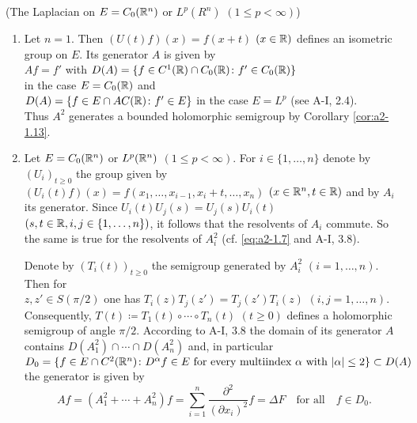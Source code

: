 \begin{example*}\label{ex:a2-1.13-kgk}(The Laplacian on $E = C_{0}(\mathbb{R}^{n})$ or $L^{p}(R^{n})$ $(1 \leq p < \infty)$)
\begin{enumerate}[\upshape (i), wide, labelsep=1em, itemsep=1ex]
\item \label{ex:a2-1.13-kgk-1}
Let $n = 1$.
Then $(U(t)f)(x) = f(x+t)$ $(x \in \mathbb{R})$ defines an isometric group on $E$.
Its generator $A$ is given by \\
$Af = f'$ with 
$D(A) = \{f \in C^{1}(\mathbb{R}) \cap C_{0}(\mathbb{R}) \colon f' \in C_{0}(\mathbb{R})\}$ \\
in the case $E = C_{0}(\mathbb{R})$ and \\
$D(A) = \{f \in E \cap AC(\mathbb{R}) \colon f' \in E\}$ in the case $E = L^{p}$ (see A-I, 2.4).\\
Thus $A^{2}$ generates a bounded holomorphic semigroup by Corollary \ref{cor:a2-1.13}. 
\item \label{ex:a2-1.13-kgk-2}
Let $E = C_{0}(\mathbb{R}^{n})$ or $L^{p}(\mathbb{R}^{n})$ $(1 \leq p < \infty)$.
For $i \in \{1,\ldots,n\}$ denote by $(U_{i})_{t \geq 0}$ the group given by 
$(U_{i}(t)f)(x) = f(x_{1},\ldots,x_{i-1},x_{i}+t,\ldots,x_{n})$ $(x \in \mathbb{R}^{n}, t \in \mathbb{R})$ 
and by $A_{i}$ its generator.
Since $U_{i}(t)U_{j}(s) = U_{j}(s)U_{i}(t)$ $(s,t \in \mathbb{R}, i,j \in \{1,\ldots,n\})$, it follows that the resolvents of $A_{i}$ commute.
So the same is true for the resolvents of $A_{i}^{2}$ (cf. \eqref{eq:a2-1.7} and A-I, 3.8). 

Denote by $(T_{i}(t))_{t \geq 0}$ 
the semigroup generated by $A_{i}^{2}$ $(i=1,\ldots,n)$.
Then for \\
$z,z' \in S(\pi/2)$ one has $T_{i}(z)T_{j}(z') = T_{j}(z')T_{i}(z)$ $(i,j=1,\ldots,n)$.
Consequently, $T(t) \coloneqq T_{1}(t) \circ \cdots \circ T_{n}(t)$ $(t \geq 0)$ defines a holomorphic semigroup of angle $\pi/2$.
According to A-I, 3.8 the domain of its generator $A$ contains $D(A_{1}^{2}) \cap \cdots \cap D(A_{n}^{2})$ and, in particular\\ $D_{0} = \{f \in E \cap C^{2}(\mathbb{R}^{n}) \colon D^{\alpha}f \in E \text{ for every multiindex } \alpha \text{ with } |\alpha| \leq 2\} \subset D(A)$ \\
the generator is given by
\[
    Af = (A_{1}^{2} + \cdots + A_{n}^{2})f =
    \sum_{i = 1}^{n} \frac{\partial^{2}}{(\partial x_{i})^{2}} f
    = \Delta F \quad \text{for all} \quad f \in D_{0}.
\]
\end{enumerate}
\end{example*}
